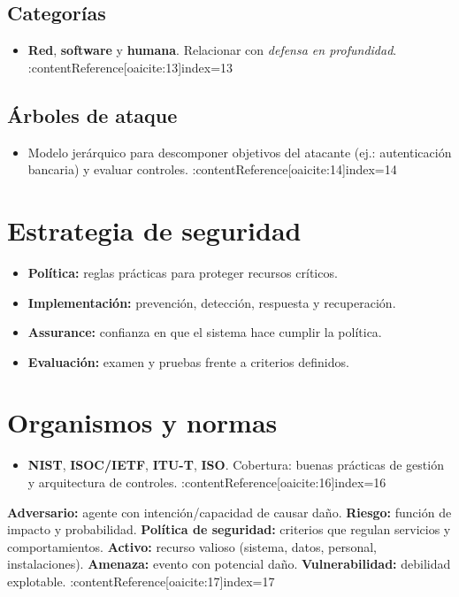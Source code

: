 \documentclass[11pt,a4paper]{article}
\begin{document}
    \subsection{Categorías}
    \begin{itemize}
        \item \textbf{Red}, \textbf{software} y \textbf{humana}. Relacionar con \textit{defensa en profundidad}. :contentReference[oaicite:13]{index=13}
    \end{itemize}
    \subsection{Árboles de ataque}
    \begin{itemize}
        \item Modelo jerárquico para descomponer objetivos del atacante (ej.: autenticación bancaria) y evaluar controles. :contentReference[oaicite:14]{index=14}
    \end{itemize}

    \section{Estrategia de seguridad}
    \begin{itemize}
        \item \textbf{Política:} reglas prácticas para proteger recursos críticos.
        \item \textbf{Implementación:} prevención, detección, respuesta y recuperación.
        \item \textbf{Assurance:} confianza en que el sistema hace cumplir la política.
        \item \textbf{Evaluación:} examen y pruebas frente a criterios definidos.
    \end{itemize}

    \section{Organismos y normas}
    \begin{itemize}
        \item \textbf{NIST}, \textbf{ISOC/IETF}, \textbf{ITU-T}, \textbf{ISO}. Cobertura: buenas prácticas de gestión y arquitectura de controles. :contentReference[oaicite:16]{index=16}
    \end{itemize}

    \begin{VocabBox}
        \textbf{Adversario:} agente con intención/capacidad de causar daño. \;
        \textbf{Riesgo:} función de impacto y probabilidad. \;
        \textbf{Política de seguridad:} criterios que regulan servicios y comportamientos. \;
        \textbf{Activo:} recurso valioso (sistema, datos, personal, instalaciones). \;
        \textbf{Amenaza:} evento con potencial daño. \;
        \textbf{Vulnerabilidad:} debilidad explotable. :contentReference[oaicite:17]{index=17}
    \end{VocabBox}
\end{document}
